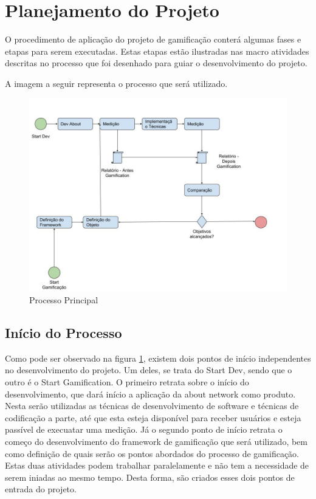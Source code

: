 \section{Planejamento do Projeto}
\label{sub:planejamento_do_projeto}
O procedimento de aplicação do projeto de gamificação conterá algumas fases
e etapas para serem executadas. Estas etapas estão ilustradas nas macro
atividades descritas no processo que foi desenhado para guiar o desenvolvimento
do projeto.

A imagem a seguir representa o processo que será utilizado.

\begin{figure}[h]
    \centering
    \includegraphics[width=450px, scale=1]{figuras/mainprocess}
    \caption{Processo Principal}
    \label{fig:mainprocess}
\end{figure}

\subsection{Início do Processo}
\label{sub:initialprocess}
Como pode ser observado na figura \ref{fig:mainprocess}, existem dois pontos
de início independentes no desenvolvimento do projeto. Um deles, se trata do
Start Dev, sendo que o outro é o Start Gamification. O primeiro retrata sobre
o início do desenvolvimento, que dará início a aplicação da about network
como produto. Nesta serão utilizadas as técnicas de desenvolvimento de software
e técnicas de codificação a parte, até que esta esteja disponível para receber
usuários e esteja passível de execuatar uma medição. Já o segundo ponto de início
retrata o começo do desenvolvimento do framework de gamificação que será utilizado,
bem como definição de quais serão os pontos abordados do processo de gamificação.
Estas duas atividades podem trabalhar paralelamente e não tem a necessidade de
serem iniadas ao mesmo tempo. Desta forma, são criados esses dois pontos de
entrada do projeto.

